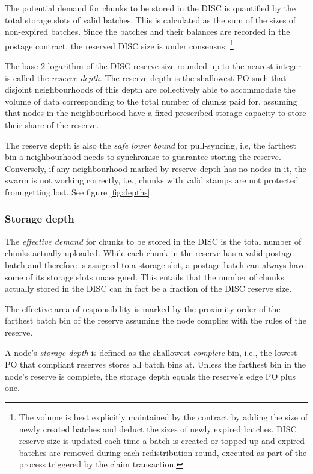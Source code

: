 The potential demand for chunks to be stored in the DISC is quantified by the total storage slots of valid batches. This is calculated as the sum of the sizes of non-expired batches. Since the batches and their balances are recorded in the postage contract, the reserved DISC size is under consensus.%
%
\footnote{The volume is best explicitly maintained by the contract by adding the size of newly created batches and deduct the sizes of newly expired batches. DISC reserve size is updated each time a batch is created or topped up and expired batches are removed during each redistribution round, executed as part of the process triggered by the claim transaction.}  

The base 2 logarithm of the DISC reserve size rounded up to the nearest integer is called the \emph{reserve depth}. The reserve depth is the shallowest PO such that disjoint neighbourhoods of this depth are collectively able to accommodate the volume of data corresponding to the total number of chunks paid for, assuming that nodes in the neighbourhood have a fixed prescribed storage capacity to store their share of the reserve. 

The reserve depth is also the \emph{safe lower bound} for pull-syncing, i.e, the farthest bin a neighbourhood needs to synchronise to guarantee storing the reserve.
Conversely, if any neighbourhood marked by reserve depth has no nodes in it, the swarm is not working correctly, i.e., chunks with valid stamps are not protected from getting lost. See figure \ref{fig:depths}.

\subsubsection{Storage depth}

The \emph{effective demand} for chunks to be stored in the DISC is the total number of chunks actually uploaded. While each chunk in the reserve has a valid postage batch and therefore is assigned to a storage slot, a postage batch can always have some of its storage slots unassigned. This entails that the number of chunks actually stored in the DISC can in fact be a fraction of the DISC reserve size. 

The effective area of responsibility is  marked by the proximity order of the farthest batch bin of the reserve assuming the node complies with the rules of the reserve. 

A node's \emph{storage depth} is defined as the shallowest \emph{complete} bin, i.e., the lowest PO that compliant reserves stores all batch bins at. Unless the farthest bin in the node's reserve is complete, the storage depth equals the reserve's edge PO plus one.

